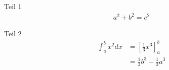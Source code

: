 Teil 1
\begin{align*}
    a^{2} + b^{2} = c^{2}
\end{align*}

Teil 2
\begin{align*}
    \int_{a}^{b} x^{2}dx &= \left[ \frac{1}{3}x^{3} \right]_{a}^{b}\\
    &= \frac{1}{3}b^{3} - \frac{1}{3}a^{3}
\end{align*}